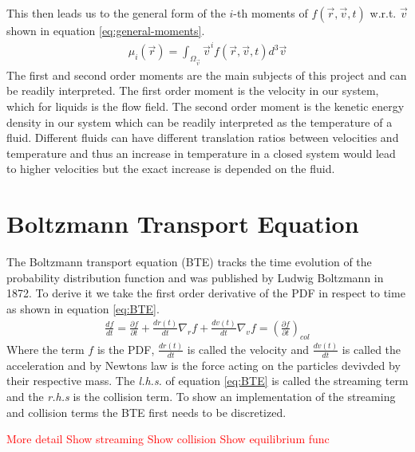\documentclass[a4paper,11pt, oneside]{book}
\begin{document}
This then leads us to the general form of the $i$-th moments of $ f(\vec{r},\vec{v},t) $ w.r.t. $ \vec{v} $ shown in equation \ref{eq:general-moments}.
\begin{equation}
  \label{eq:general-moments}
  \begin{aligned}
    \mu_{i}(\vec{r}) =\int_{\Omega_{\vec{v}}}\vec{v}^{i} f(\vec{r},\vec{v},t)d^{3}\vec{v}
  \end{aligned}
\end{equation}
The first and second order moments are the main subjects of this project and can be readily interpreted.
The first order moment is the velocity in our system, which for liquids is the flow field.
The second order moment is the kenetic energy density in our system which can be readily interpreted as the temperature of a fluid.
Different fluids can have different translation ratios between velocities and temperature and thus an increase in temperature in a closed system would lead to higher velocities but the exact increase is depended on the fluid.


\section{Boltzmann Transport Equation}
The Boltzmann transport equation (BTE) tracks the time evolution of the probability distribution function and was published by Ludwig Boltzmann in 1872.
To derive it we take the first order derivative of the PDF in respect to time as shown in
equation \ref{eq:BTE}.
\begin{equation}
  \label{eq:BTE}
  \begin{aligned}
    \frac{df}{dt} =\frac{\partial f}{\partial t} + \frac{dr(t)}{dt} \nabla_{r}f + \frac{dv(t)}{dt} \nabla_{v}f = \left( \frac{\partial f}{\partial t} \right)_{col}
  \end{aligned}
\end{equation}
Where the term $f$ is the PDF, $\frac{dr(t)}{dt}$ is called the velocity and $\frac{dv(t)}{dt}$ is called the acceleration and by Newtons law is the force acting on the particles devivded by their respective mass.
The \textit{l.h.s.} of equation \ref{eq:BTE} is called the streaming term and the \textit{r.h.s} is the collision term.
To show an implementation of the streaming and collision terms the BTE first needs to be discretized.

\textcolor{red}{ More detail}
\textcolor{red}{Show streaming}
\textcolor{red}{Show collision}
\textcolor{red}{Show equilibrium func}
\end{document}
